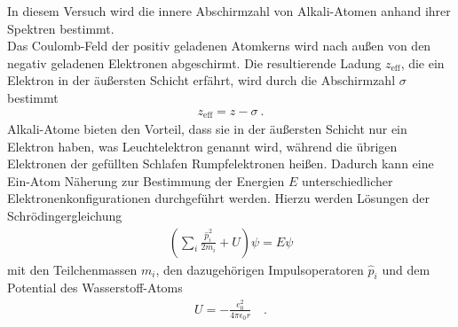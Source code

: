 In diesem Versuch wird die innere Abschirmzahl von Alkali-Atomen anhand ihrer Spektren bestimmt. \\
Das Coulomb-Feld der positiv geladenen Atomkerns wird nach außen von den negativ geladenen Elektronen abgeschirmt. Die resultierende Ladung $z_\text{eff}$, die ein Elektron in der äußersten Schicht  erfährt, wird durch die Abschirmzahl $\sigma$ bestimmt
\begin{align}\label{Abschirmzahl}
z_\text{eff} = z - \sigma \ .
\end{align}
Alkali-Atome bieten den Vorteil, dass sie in der äußersten Schicht nur ein Elektron haben, was Leuchtelektron genannt wird, während die übrigen Elektronen der gefüllten Schlafen  Rumpfelektronen heißen. Dadurch kann eine Ein-Atom Näherung zur Bestimmung der Energien $E$ unterschiedlicher Elektronenkonfigurationen durchgeführt werden. Hierzu werden Lösungen der Schrödingergleichung
\begin{align}
\left(\sum_i \frac{\hat{p}_i^2}{2m_i} + U \right) \psi = E \psi
\end{align}
mit den Teilchenmassen $m_i$,  den dazugehörigen Impulsoperatoren $\hat{p}_i$ und dem Potential des Wasserstoff-Atoms
\begin{align}
	U = -\frac{e_0^2}{4 \pi \epsilon_0 r} \quad .
\end{align}

